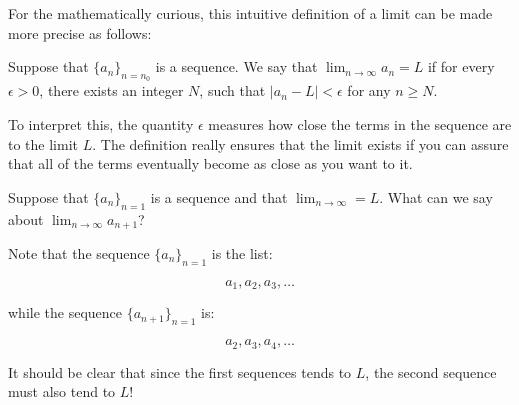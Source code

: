 \documentclass{ximera}
\begin{document}
For the mathematically curious, this intuitive definition of a limit can be made more precise as follows:

\begin{definition}
\label{definition:limit-of-a-sequence}
Suppose that $\{a_n\}_{n=n_0}$ is a sequence.  We say that
$\lim_{n\to \infty}a_n=L$ if for every $\epsilon>0$, there exists an integer $N$, such that $|a_n-L|<\epsilon$ for any $n \geq N$.
\end{definition}

To interpret this, the quantity $\epsilon$ measures how close the terms in the sequence are to the limit $L$.  The definition really ensures that  the limit exists if you can assure that all of the terms eventually become as close as you want to it.  

\begin{question}
Suppose that $\{a_n\}_{n=1}$ is a sequence and that $\lim_{n \to \infty} = L$.  What can we say about $\lim_{n \to \infty} a_{n+1}$?
\begin{multipleChoice}
\end{multipleChoice}

\begin{feedback}
Note that the sequence $\{a_n\}_{n=1}$ is the list:

\[
a_1,a_2,a_3, \ldots
\]

while the sequence $\{a_{n+1}\}_{n=1}$ is:

\[
a_2,a_3,a_4, \ldots
\]

It should be clear that since the first sequences tends to $L$, the second sequence must also tend to $L$!
\end{feedback}

\end{question}
\end{document}
